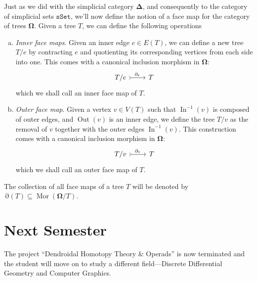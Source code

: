 \documentclass[11pt, reqno]{amsart}
\theoremstyle{definition}
\newcommand{\catfont}{\texttt}
\DeclareMathOperator{\Mor}{Mor}   %
\newcommand{\Splx}{{\mathbf{\Delta}}}           %
\newcommand{\sSet}{{\catfont{sSet}}}            %
\newcommand{\Tree}{{\mathbf{\Omega}}}
\DeclareMathOperator{\Input}{In}
\DeclareMathOperator{\Output}{Out}
\DeclareMathOperator{\TreeFace}{\partial}
\begin{document}
Just as we did with the simplicial category \(\Splx\), and consequently to
the category of simplicial sets \(\sSet\), we'll now define the notion of a
face map for the category of trees \(\Tree\). Given a tree \(T\), we can
define the following operations 
\begin{enumerate}[(a)]\setlength\itemsep{0em}
    \item \emph{Inner face maps}. Given an inner edge \(e \in E(T)\), we can
        define a new tree \(T/e\) by contracting \(e\) and quotienting its
        corresponding vertices from each side into one. This comes with a
        canonical inclusion morphism in \(\Tree\):
        \[
            \begin{tikzcd}
                T/e \ar[r, "\TreeFace_e", tail] &T
            \end{tikzcd}
        \]
        which we shall call an inner face map of \(T\).
    \item \emph{Outer face map}. Given a vertex \(v \in V(T)\) such that
        \(\Input^{-1}(v)\) is composed of outer edges, and \(\Output(v)\) is an
        inner edge, we define the tree \(T/v\) as the removal of \(v\) together
        with the outer edges \(\Input^{-1}(v)\). This construction comes with a
        canonical inclusion morphism in \(\Tree\):
        \[
            \begin{tikzcd}
                T/v \ar[r, "\TreeFace_v", tail] &T
            \end{tikzcd}
        \]
        which we shall call an outer face map of \(T\).
\end{enumerate}
The collection of all face maps of a tree \(T\) will be denoted by
\(\TreeFace(T) \subseteq \Mor(\Tree/T)\).


\section{Next Semester}

The project ``Dendroidal Homotopy Theory \& Operads'' is now terminated and the student will move on
to study a different field---Discrete Differential Geometry and Computer Graphics.

\printbibliography
\end{document}
